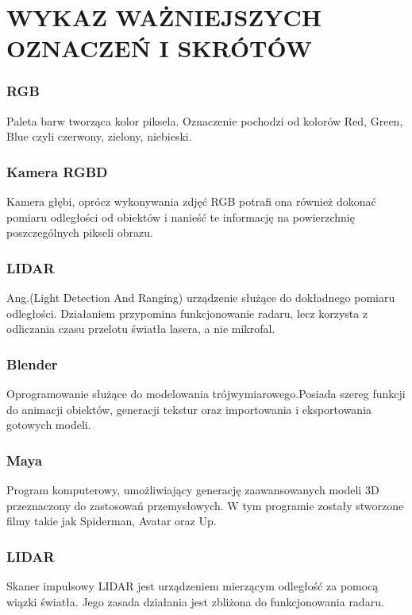 \chapter*{WYKAZ WAŻNIEJSZYCH OZNACZEŃ I SKRÓTÓW}
\subsection*{RGB}
Paleta barw tworząca kolor piksela. Oznaczenie pochodzi od kolorów Red, Green, Blue czyli czerwony, zielony, niebieski.
\subsection*{Kamera RGBD}
Kamera głębi, oprócz wykonywania zdjęć RGB potrafi ona również dokonać pomiaru odległości od obiektów i nanieść te informację na powierzchnię poszczególnych pikseli obrazu.
\subsection*{LIDAR}
Ang.(Light Detection And Ranging) urządzenie służące do dokładnego pomiaru odległości. Działaniem przypomina funkcjonowanie radaru, lecz korzysta z odliczania czasu przelotu światła lasera, a nie mikrofal.
\subsection*{Blender}
Oprogramowanie służące do modelowania trójwymiarowego.Posiada szereg funkcji do animacji obiektów, generacji tekstur oraz importowania i eksportowania gotowych modeli.
\subsection*{Maya}
Program komputerowy, umożliwiający generację zaawansowanych modeli 3D przeznaczony do zastosowań przemysłowych. W tym programie zostały stworzone filmy takie jak Spiderman, Avatar oraz Up.
\subsection*{LIDAR}
Skaner impulsowy LIDAR jest urządzeniem mierzącym odległość za pomocą wiązki światła. Jego zasada działania jest zbliżona do funkcjonowania radaru.